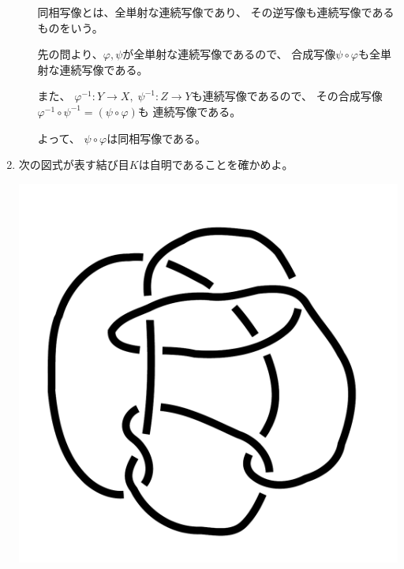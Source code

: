 \documentclass[12pt,b5paper]{ltjsarticle}
\begin{document}
\begin{enumerate}
\begin{enumerate}
            \dotfill

            同相写像とは、全単射な連続写像であり、
            その逆写像も連続写像であるものをいう。

            先の問より、$\varphi,\psi$が全単射な連続写像であるので、
            合成写像$\psi\circ\varphi$も全単射な連続写像である。

            また、
            $\varphi^{-1}:Y\to X,\; \psi^{-1}:Z\to Y$も連続写像であるので、
            その合成写像$\varphi^{-1}\circ\psi^{-1}=(\psi\circ\varphi)$も
            連続写像である。

            よって、
            $\psi\circ\varphi$は同相写像である。

            \hrulefill


      \end{enumerate}


 \item
      次の図式が表す結び目$K$は自明であることを確かめよ。
      \begin{center}
       \includegraphics[scale=0.2]{knot_05_01.pdf}
      \end{center}

      \dotfill


\end{enumerate}
\end{document}
